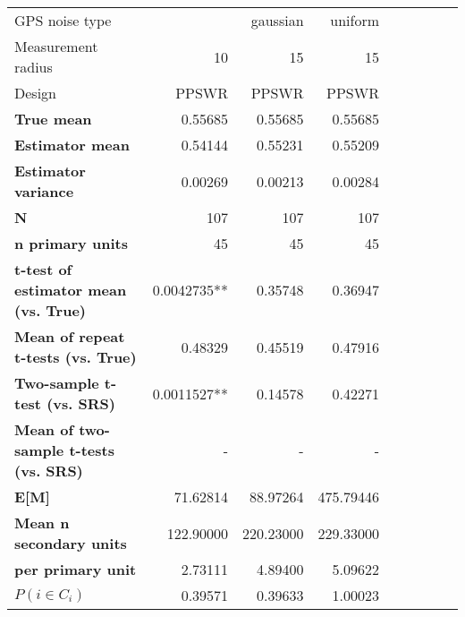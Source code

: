 \begin{tabular}{l|r|rrr|r|rrr}
\toprule
GPS noise type & \multicolumn{2}{r}{gaussian} & uniform \\
Measurement radius & 10 & 15 & 15 \\
Design & PPSWR & PPSWR & PPSWR \\
\midrule
\textbf{True mean} &  0.55685 &  0.55685 &  0.55685 \\
\textbf{Estimator mean} & 0.54144 & 0.55231 & 0.55209 \\
\textbf{Estimator variance} & 0.00269 & 0.00213 & 0.00284 \\
\textbf{N} & 107 & 107 & 107 \\
\textbf{n primary units} & 45 & 45 & 45 \\
\textbf{t-test of estimator mean (vs. True)} & 0.0042735** & 0.35748 & 0.36947 \\
\textbf{Mean of repeat t-tests (vs. True)} & 0.48329 & 0.45519 & 0.47916 \\
\textbf{Two-sample t-test (vs. SRS)} & 0.0011527** & 0.14578 & 0.42271 \\
\textbf{Mean of two-sample t-tests (vs. SRS)} & - & - & - \\
\textbf{E[M]} & 71.62814 & 88.97264 & 475.79446 \\
\textbf{Mean n secondary units} & 122.90000 & 220.23000 & 229.33000 \\
\textbf{     per primary unit} & 2.73111 & 4.89400 & 5.09622 \\
\textbf{$P(i \in C_i)$} & 0.39571 & 0.39633 & 1.00023 \\
\bottomrule
\end{tabular}
